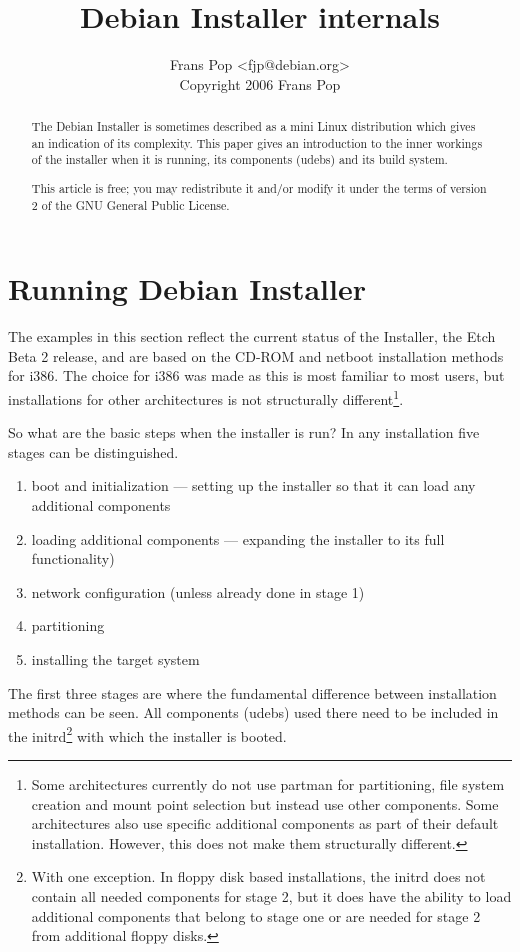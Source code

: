 \documentclass[a4paper,10pt]{article}
\title{Debian Installer internals}
\author{Frans Pop <fjp@debian.org> \\
Copyright 2006 Frans Pop}
\begin{document}
\maketitle

\tableofcontents

\begin{abstract}
The Debian Installer is sometimes described as a mini Linux distribution which gives an indication of its complexity. This paper gives an introduction to the inner workings of the installer when it is running, its components (udebs) and its build system.

This article is free; you may redistribute it and/or modify it under the terms of version 2 of the GNU General Public License. 
\end{abstract}

\newpage
\section{Running Debian Installer}

The examples in this section reflect the current status of the Installer, the Etch Beta 2 release, and are based on the CD-ROM and netboot installation methods for i386. The choice for i386 was made as this is most familiar to most users, but installations for other architectures is not structurally different\footnote{Some architectures currently do not use partman for partitioning, file system creation and mount point selection but instead use other components. Some architectures also use specific additional components as part of their default installation. However, this does not make them structurally different.}. 

So what are the basic steps when the installer is run? In any installation five stages can be distinguished. 

\begin{enumerate}
\item boot and initialization — setting up the installer so that it can load any additional components 
\item loading additional components — expanding the installer to its full functionality) 
\item network configuration (unless already done in stage 1) 
\item partitioning 
\item installing the target system 
\end{enumerate}

The first three stages are where the fundamental difference between installation methods can be seen. All components (udebs) used there need to be included in the initrd\footnote{With one exception. In floppy disk based installations, the initrd does not contain all needed components for stage 2, but it does have the ability to load additional components that belong to stage one or are needed for stage 2 from additional floppy disks.} with which the installer is booted. 
\end{document}
